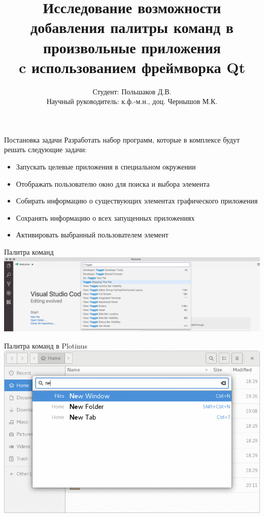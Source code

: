 \documentclass[aspectratio=1610]{beamer}
\title[Thesis]{Исследование возможности добавления палитры команд
в произвольные приложения\\c использованием фреймворка Qt}
\author{Студент: Польшаков Д.В. \\
Научный руководитель: к.ф.-м.н., доц. Чернышов М.К.}
\institute{ВГУ}
\date{\the\year}
\begin{document}
	
\begin{frame}[plain]
	\titlepage
\end{frame}

\begin{frame}{Постановка задачи}
	Разработать набор программ, которые в комплексе будут решать следующие
	задачи:
	
	\begin{itemize}
		\item Запускать целевые приложения в специальном окружении
		\item Отображать пользователю окно для поиска и выбора элемента
		\item Собирать информацию о существующих элементах графического приложения
		\item Сохранять информацию о всех запущенных приложениях
		\item Активировать выбранный пользователем элемент
	\end{itemize}
\end{frame}

\begin{frame}{Палитра команд}
	\includegraphics[width=\textwidth]{vscode}
\end{frame}

\begin{frame}{Палитра команд в Plotinus}
	\centering
	\includegraphics[height=0.9\textheight]{Plotinus}
\end{frame}
\end{document}
